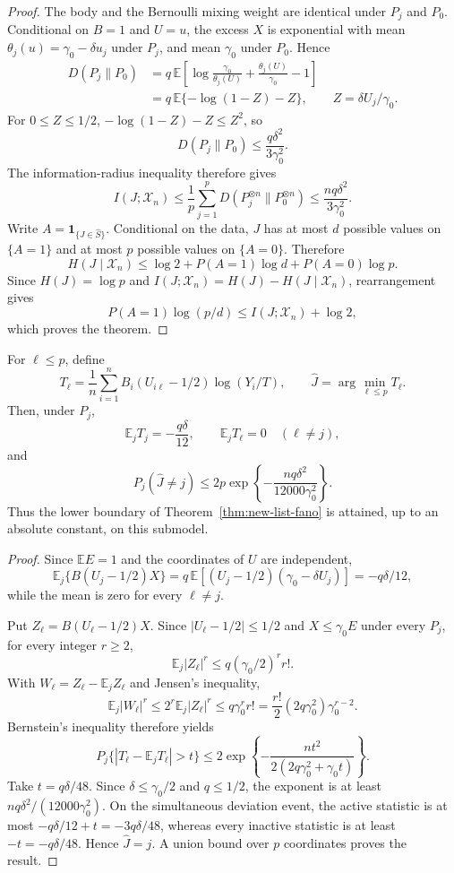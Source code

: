 \begin{proof}
The body and the Bernoulli mixing weight are identical under $P_j$ and
$P_0$. Conditional on $B=1$ and $U=u$, the excess $X$ is exponential with
mean $\theta_j(u)=\gamma_0-\delta u_j$ under $P_j$, and mean $\gamma_0$
under $P_0$. Hence
\begin{align*}
 D(P_j\|P_0)
 &=q\,\mathbb E\left[
  \log\frac{\gamma_0}{\theta_j(U)}
  +\frac{\theta_j(U)}{\gamma_0}-1
 \right]\\
 &=q\,\mathbb E\{-\log(1-Z)-Z\},
 \qquad Z=\delta U_j/\gamma_0.
\end{align*}
For $0\le Z\le1/2$,
$-\log(1-Z)-Z\le Z^2$, so
\[
 D(P_j\|P_0)\le\frac{q\delta^2}{3\gamma_0^2}.
\]
The information-radius inequality therefore gives
\[
 I(J;\mathcal X_n)
 \le\frac1p\sum_{j=1}^pD(P_j^{\otimes n}\|P_0^{\otimes n})
 \le\frac{nq\delta^2}{3\gamma_0^2}.
\]
Write $A=\mathbf 1_{\{J\in\widehat S\}}$. Conditional on the data,
$J$ has at most $d$ possible values on $\{A=1\}$ and at most $p$ possible
values on $\{A=0\}$. Therefore
\[
 H(J\mid\mathcal X_n)
 \le\log2+P(A=1)\log d+P(A=0)\log p.
\]
Since $H(J)=\log p$ and
$I(J;\mathcal X_n)=H(J)-H(J\mid\mathcal X_n)$, rearrangement gives
\[
 P(A=1)\log(p/d)\le I(J;\mathcal X_n)+\log2,
\]
which proves the theorem.
\end{proof}

\begin{theorem}
\label{thm:new-submodel-upper}
For $\ell\le p$, define
\[
 T_\ell=\frac1n\sum_{i=1}^n
 B_i(U_{i\ell}-1/2)\log(Y_i/T),
 \qquad
 \widehat J=\arg\min_{\ell\le p}T_\ell.
\]
Then, under $P_j$,
\[
 \mathbb E_jT_j=-\frac{q\delta}{12},
 \qquad
 \mathbb E_jT_\ell=0\quad(\ell\ne j),
\]
and
\[
 P_j(\widehat J\ne j)
 \le2p\exp\left\{-\frac{nq\delta^2}{12000\gamma_0^2}\right\}.
\]
Thus the lower boundary of Theorem~\ref{thm:new-list-fano} is attained, up
to an absolute constant, on this submodel.
\end{theorem}

\begin{proof}
Since $\mathbb EE=1$ and the coordinates of $U$ are independent,
\[
 \mathbb E_j\{B(U_j-1/2)X\}
 =q\,\mathbb E[(U_j-1/2)(\gamma_0-\delta U_j)]
 =-q\delta/12,
\]
while the mean is zero for every $\ell\ne j$.

Put $Z_\ell=B(U_\ell-1/2)X$. Since
$|U_\ell-1/2|\le1/2$ and $X\le\gamma_0E$ under every $P_j$,
for every integer $r\ge2$,
\[
 \mathbb E_j|Z_\ell|^r
 \le q(\gamma_0/2)^rr!.
\]
With $W_\ell=Z_\ell-\mathbb E_jZ_\ell$ and Jensen's inequality,
\[
 \mathbb E_j|W_\ell|^r
 \le2^r\mathbb E_j|Z_\ell|^r
 \le q\gamma_0^rr!
 =\frac{r!}{2}(2q\gamma_0^2)\gamma_0^{r-2}.
\]
Bernstein's inequality therefore yields
\[
 P_j\{|T_\ell-\mathbb E_jT_\ell|>t\}
 \le2\exp\left\{-\frac{nt^2}
 {2(2q\gamma_0^2+\gamma_0t)}\right\}.
\]
Take $t=q\delta/48$. Since $\delta\le\gamma_0/2$ and $q\le1/2$, the
exponent is at least $nq\delta^2/(12000\gamma_0^2)$. On the simultaneous
deviation event, the active statistic is at most
$-q\delta/12+t=-3q\delta/48$, whereas every inactive statistic is at least
$-t=-q\delta/48$. Hence $\widehat J=j$. A union bound over $p$
coordinates proves the result.
\end{proof}

